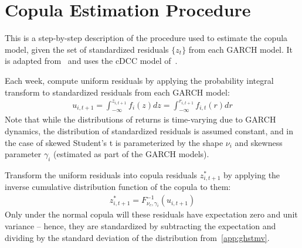 
\section{Copula Estimation Procedure} %
\label{app:copula_cdcc}

This is a step-by-step description of the procedure used to estimate the copula model, given the set of standardized residuals $\{z_{t}\}$ from each GARCH model. It is adapted from~\textcite{ChristoffersenErrunzaJacobLanglois2012} and uses the cDCC model of~\textcite{Aielli2013}.

Each week, compute uniform residuals by applying the probability integral transform to standardized residuals from each GARCH model:
\begin{align}
  u_{i, t+1}
    = \int_{-\infty}^{z_{i,t+1}} f_{i}(z) dz
    = \int_{-\infty}^{r_{i,t+1}} f_{i,t}(r)dr
\end{align}
Note that while the distributions of returns is time-varying due to GARCH dynamics, the distribution of standardized residuals is assumed constant, and in the case of skewed Student's t is parameterized by the shape $\nu_i$ and skewness parameter $\gamma_i$ (estimated as part of the GARCH models).

Transform the uniform residuals into copula residuals $z_{i,t+1}^*$ by applying the inverse cumulative distribution function of the copula to them:
\begin{align}
  z_{i,t+1}^* = F_{\nu_c,\gamma_i}^{-1}(u_{i,t+1})
\end{align}
Only under the normal copula will these residuals have expectation zero and unit variance -- hence, they are standardized by subtracting the expectation and dividing by the standard deviation of the distribution from~\autoref{app:ghstmv}.

